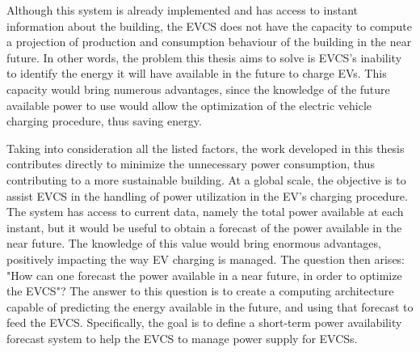 



Although this system is already implemented and has access to instant information about the building, the \ac{EVCS} does not have the capacity to compute a projection of production and consumption behaviour of the building in the near future. In other words, the problem this thesis aims to solve is \ac{EVCS}'s inability to identify the energy it will have available in the future to charge \ac{EV}s. This capacity would bring numerous advantages, since the knowledge of the future available power to use would allow the optimization of the electric vehicle charging procedure, thus saving energy.

Taking into consideration all the listed factors, the work developed in this thesis contributes directly to minimize the unnecessary power consumption, thus contributing to a more sustainable building. At a global scale, the objective is to assist \ac{EVCS} in the handling of power utilization in the  \ac{EV}'s charging procedure. The system has access to current data, namely the total power available at each instant, but it would be useful to obtain a forecast of the power available in the near future. The knowledge of this value would bring enormous advantages, positively impacting the way \ac{EV} charging is managed. The question then arises: "How can one forecast the power available in a near future, in order to optimize the \ac{EVCS}"? The answer to this question is to create a computing architecture capable of predicting the energy available in the future, and using that forecast to feed the \ac{EVCS}. Specifically, the goal is to define a short-term power availability forecast system to help the \ac{EVCS} to manage power supply for \ac{EVCSs}. 





